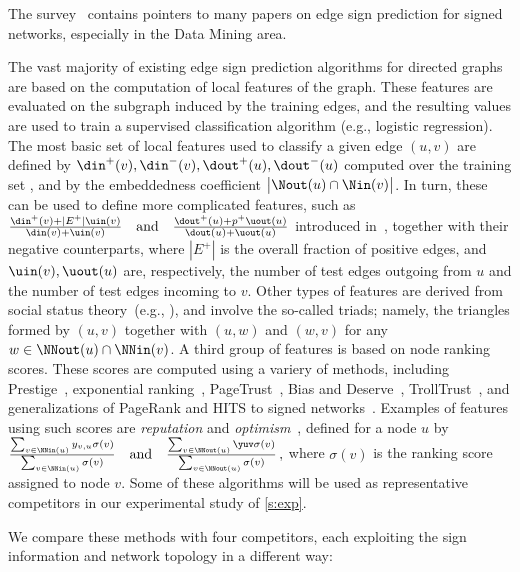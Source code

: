 The survey~\autocite{Tang2015a} contains pointers to many papers on edge sign prediction for
signed networks, especially in the Data Mining area.

The vast majority of existing edge sign prediction algorithms for
directed graphs are based on the computation of local features of the graph. These features are
evaluated on the subgraph induced by the training edges, and the resulting values are used to train
a supervised classification algorithm (e.g., logistic regression). The most basic set of local
features used to classify a given edge $(u,v)$ are defined by
$\din^+(v),\din^-(v),\dout^+(u),\dout^-(u)$ computed over the training set \trainset{}, and by the
embeddedness coefficient $\big|\Nout(u) \cap \Nin(v)\big|$. In turn, these can be used to define
more complicated features, such as
\(
	\frac{\din^+(v) + |E^+|\uin(v)}{\din(v) + \uin(v)}
\quad\text{and}\quad
	\frac{\dout^+(u) + p^+\uout(u)}{\dout(u) + \uout(u)}
\)
introduced in~\autocite{Bayesian15}, together with their negative counterparts, where $|E^+|$ is the
overall fraction of positive edges, and $\uin(v),\uout(u)$ are, respectively, the number of test
edges outgoing from $u$ and the number of test edges incoming to $v$.
Other types of features are derived from social status theory~(e.g., \autocite{Leskovec2010}), and
involve the so-called triads; namely, the triangles formed by $(u,v)$ together with $(u,w)$ and
$(w,v)$ for any $w \in \NNout(u) \cap \NNin(v)$. A third group of features is based on node ranking
scores. These scores are computed using a variery of methods, including
Prestige~\autocite{zolfaghar2010mining}, exponential ranking~\autocite{traag2010exponential},
PageTrust~\autocite{de2008pagetrust}, Bias and Deserve~\autocite{mishra2011finding},
TrollTrust~\autocite{wu2016troll}, and generalizations of PageRank and HITS to signed
networks~\autocite{shahriari2014ranking}. Examples of features using such scores are \textsl{reputation}
and \textsl{optimism}~\autocite{shahriari2014ranking}, defined for a node $u$ by
\(
	\frac{\sum_{v \in \NNin(u)} y_{v,u}\sigma(v)}{\sum_{v \in \NNin(u)} \sigma(v)}
\quad\text{and}\quad
	\frac{\sum_{v \in \NNout(u)} \yuv\sigma(v)}{\sum_{v \in \NNout(u)} \sigma(v)}\,,
\)
where $\sigma(v)$ is the ranking score assigned to node $v$. Some of these algorithms will be used
as representative competitors in our experimental study of \autoref{s:exp}.

\iffalse
We compare these methods with four competitors, each exploiting the sign information and network
topology in a different way:

